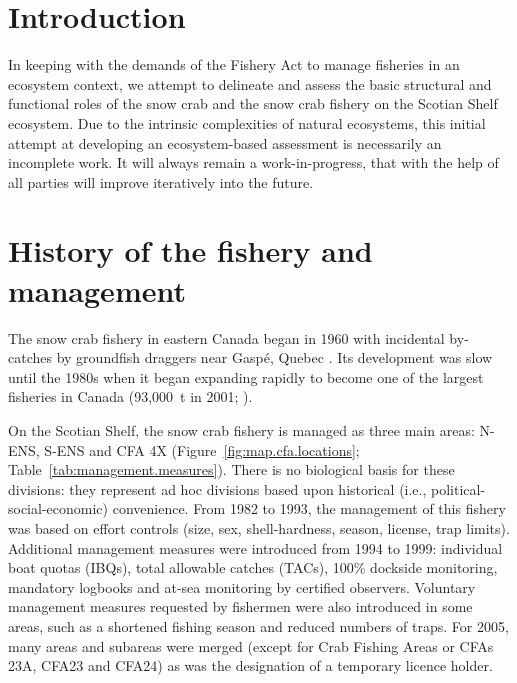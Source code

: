 \documentclass[11pt]{article}
\begin{document}




\newpage
{}
\setcounter{page}{1}

\section{Introduction}

In keeping with the demands of the Fishery Act to manage fisheries in an ecosystem context, we attempt to delineate and assess the basic structural and functional roles of the snow crab and the snow crab fishery on the Scotian Shelf ecosystem. Due to the intrinsic complexities of natural ecosystems, this initial attempt at developing an ecosystem-based assessment is necessarily an incomplete work. It will always remain a work-in-progress, that with the help of all parties will improve iteratively into the future. 


\section{History of the fishery and management}

The snow crab fishery in eastern Canada began in 1960 with incidental by-catches by groundfish draggers near Gasp\'{e}, Quebec \citep{Elner1986}. Its development was slow until the 1980s when it began expanding rapidly to become one of the largest fisheries in Canada (93,000~t in 2001; \citealt{Dufour2003}). 

On the Scotian Shelf, the snow crab fishery is managed as three main areas: N-ENS, S-ENS and CFA 4X (Figure~\ref{fig:map.cfa.locations}; Table~\ref{tab:management.measures}). There is no biological basis for these divisions: they represent ad hoc divisions based upon historical (i.e., political-social-economic) convenience. From 1982 to 1993, the management of this fishery was based on effort controls (size, sex, shell-hardness, season, license, trap limits). Additional management measures were introduced from 1994 to 1999: individual boat quotas (IBQs), total allowable catches (TACs), 100\% dockside monitoring, mandatory logbooks and at-sea monitoring by certified observers. Voluntary management measures requested by fishermen were also introduced in some areas, such as a shortened fishing season and reduced numbers of traps. For 2005, many areas and subareas were merged (except for Crab Fishing Areas or CFAs 23A,  CFA23 and CFA24) as was the designation of a temporary licence holder.
\end{document}
